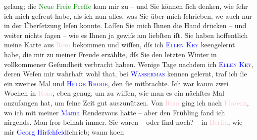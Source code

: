                gelang; die \textcolor{green}{Neue Freie Preſſe}{}\ledrightnote{\textcolor{green}{Neue Freie Presse}} kam mir zu \label{K_L01114-66v}\label{K_L01114-66h} –
               und Sie können ſich denken, wie ſehr ich mich gefreut habe, als ich nun alles, was
               Sie über mich ſchrieben, we{\geminationn} auch nur in der Überſetzung
               leſen konnte. Laſſen Sie mich Ihnen die Hand drücken – und {\pb}weiter nichts ſagen – wie es Ihnen ja gewiſs am
               liebſten iſt.\pend
           \pstart
           Sie haben hoffentlich meine Karte aus \textcolor{pink}{Rom}{}\ledrightnote{\textcolor{pink}{Rom}}
               bekommen und wiſſen, dſs ich \textcolor{blue}{\textsc{Ellen Key}}{}\ledrightnote{\textcolor{blue}{Ellen Key}} ke{\geminationn}engelernt habe, die mir zu meiner Freude
               erzählte, dſs Sie den letzten Winter in vollkommener Geſundheit verbracht haben.
               Wenige Tage nachdem ich \textcolor{blue}{\textsc{Ellen Key}}{}\ledrightnote{\textcolor{blue}{Ellen Key}}, deren Weſen mir wahrhaft wohl that, bei \textcolor{blue}{\textsc{Wasserma{\geminationn}s}}{}\ledrightnote{\textcolor{blue}{Jakob Wassermann}{\newline}\textcolor{blue}{Julie Wassermann}} kennen gelernt, traf ich ſie ein zweites Mal und {\pb}\textcolor{blue}{\textsc{Helge Rhode}}{}\ledrightnote{\textcolor{blue}{Helge Rode}}, den ſie mitbrachte. Ich war kaum zwei Wochen in \textcolor{pink}{Rom}{}\ledrightnote{\textcolor{pink}{Rom}}, eben genug, um zu wiſſen, wie man es ein nächſtes Mal anzufangen hat,
               um ſeine Zeit gut auszunützen. Von \textcolor{pink}{Rom}{}\ledrightnote{\textcolor{pink}{Rom}} ging ich
               nach \textcolor{pink}{Florenz}{}\ledrightnote{\textcolor{pink}{Florenz}}, wo ich mit meiner \textcolor{blue}{Mama}{}\ledrightnote{{$\rightarrow$}\textcolor{blue}{Louise Schnitzler}} Rendezvous hatte – aber den Frühling
               fand ich nirgends. Man fror beinah immer.\pend
           \pstart
           Sie waren – oder ſind noch? – in \textcolor{pink}{Berlin}{}\ledrightnote{\textcolor{pink}{Berlin}}, wie mir
                  \textcolor{blue}{Georg Hirſchfeld}{}\ledrightnote{\textcolor{blue}{Georg Hirschfeld}}{ }{\pb}ſchrieb; wann ko{\geminationm}en
